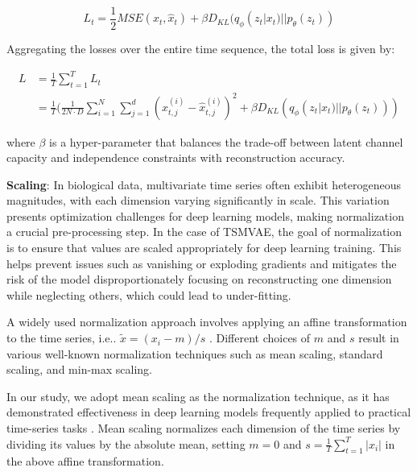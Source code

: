 \documentclass[12pt]{article} %
\begin{document}
$$L_t = \frac{1}{2}MSE(x_t, \hat x_t) + \beta D_{KL}(q_{\phi}(z_{t}|x_{t})||p_{\theta}(z_{t}))$$

Aggregating the losses over the entire time sequence, the total loss is given by:

\begin{align*}
L &= \frac{1}{T}\sum_{t=1}^{T} L_t\\
&= \frac{1}{T}(\frac{1}{2N \cdot D}\sum_{i=1}^{N}\sum_{j=1}^d(x_{t,j}^{(i)} - \hat x_{t,j}^{(i)})^2 + \beta D_{KL}(q_{\phi}(z_{t}|x_{t})||p_{\theta}(z_{t})))
\end{align*}

where $\beta$ is a hyper-parameter that balances the trade-off between latent channel capacity and independence constraints with reconstruction accuracy\citep{higgins2017beta}.


%

\textbf{Scaling}: In biological data, multivariate time series often exhibit heterogeneous magnitudes, with each dimension varying significantly in scale. This variation presents optimization challenges for deep learning models, making normalization a crucial pre-processing step. In the case of TSMVAE, the goal of normalization is to ensure that values are scaled appropriately for deep learning training. This helps prevent issues such as vanishing or exploding gradients and mitigates the risk of the model disproportionately focusing on reconstructing one dimension while neglecting others, which could lead to under-fitting.

A widely used normalization approach involves applying an affine transformation to the time series, i.e.. $\tilde{x} = {(x_i - m)}/{s}$ \citep{rabanser2020effectiveness}\citep{ansari2024chronos}. Different choices of $m$ and $s$ result in  various well-known normalization techniques such as mean scaling, standard scaling, and min-max scaling.

In our study, we adopt mean scaling as the normalization technique, as it has demonstrated effectiveness in deep learning models frequently applied to practical time-series tasks \citep{salinas2020deepar}\citep{rabanser2020effectiveness} \citep{ansari2024chronos}. Mean scaling normalizes each dimension of the time series by dividing its values by the absolute mean, setting $m = 0$ and $s= \frac{1}{T} \sum_{t=1}^{T}|x_i|$ in the above affine transformation. 
\end{document}
